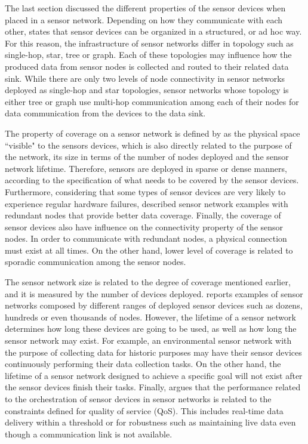 The last section discussed the different properties of the sensor devices when
placed in a sensor network. Depending on how they communicate with each other,
\cite{sn-intro02} states that sensor devices can be organized in a
structured, or ad hoc way. For this reason, the infrastructure of sensor
networks differ in topology such as single-hop, star, tree or  graph. Each of
these topologies may influence how the produced data from sensor nodes is
collected and routed to their related data sink. While there are only two
levels of node connectivity in sensor networks deployed as single-hop and
star topologies, sensor networks whose topology is either tree or graph use
multi-hop communication among each of their nodes for data communication from
the devices to the data sink.

The property of coverage on a sensor network is defined by
\cite{sn-intro01} as the physical space ``visible" to the sensors devices, which
is also directly related to the purpose of the network, its size in terms of
the number of nodes deployed and the sensor network lifetime. Therefore,
sensors are deployed in sparse or dense manners, according to the
specification of what needs to be covered by the sensor devices. Furthermore,
considering that some types of sensor devices are very likely to experience regular
hardware failures, \cite{sn-intro02} described sensor network examples with 
redundant nodes that provide better data coverage.
Finally, the coverage of sensor devices also have influence on the connectivity
property of the sensor nodes. In order to communicate with redundant nodes, a
physical connection must exist at all times. On the other hand, lower
level of coverage is related to sporadic communication among the sensor nodes.

The sensor network size is related to the degree of coverage mentioned earlier,
and it is measured by the number of devices deployed. \cite{sn-intro01}
reports examples of sensor networks composed by different ranges of deployed
sensor devices such as dozens, hundreds or even thousands of nodes. However,
the lifetime of a sensor network determines how long these devices are going
to be used, as well as how long the sensor network may exist. For example, an
environmental sensor network \cite{sn-ex01} with the purpose of collecting data
for historic purposes may have their sensor devices continuously performing
their data collection tasks. On the other hand, the lifetime of a
sensor network designed to achieve a specific goal will not exist after the sensor
devices finish their tasks. Finally, \cite{sn-intro02} argues that the
performance related to the orchestration of sensor devices in sensor networks
is related to the constraints defined for quality of service (QoS).  This includes
real-time data delivery within a threshold or for robustness such as
maintaining live data even though a communication link is not available.

